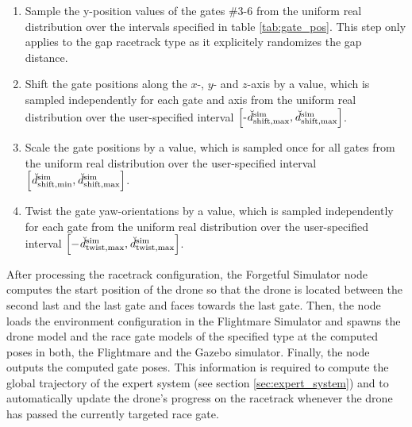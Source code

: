\begin{enumerate}
    \item Sample the y-position values 
    of the gates \#3-6 from the uniform real distribution
    over the intervals specified in table \ref{tab:gate_pos}.
    This step only applies to the gap racetrack type
    as it explicitely randomizes the gap distance.
    \item Shift the gate positions along the $x$-, $y$- and $z$-axis
    by a value, which is sampled
    independently for each gate and axis
    from the uniform real distribution
    over the user-specified interval 
    $\left[
        \text{-}\dist[\user]{\text{sim}}{\text{shift},\mxm}{}{},
        \dist[\user]{\text{sim}}{\text{shift},\mxm}{}{}\right]$.
    \item Scale the gate positions by a value,
    which is sampled once for all gates from the uniform real distribution
    over the user-specified interval
    $\left[
        \dist[\user]{\text{sim}}{\text{shift},\mnm}{}{}, 
        \dist[\user]{\text{sim}}{\text{shift},\mxm}{}{}\right]$.
    \item Twist the gate yaw-orientations
    by a value, which is sampled 
    independently for each gate 
    from the uniform real distribution
    over the user-specified interval
    $\left[
        -\dist[\user]{\text{sim}}{\text{twist},\mxm}{}{},
        \dist[\user]{\text{sim}}{\text{twist},\mxm}{}{}\right]$.
\end{enumerate}
After processing the racetrack configuration,
the Forgetful Simulator node computes
the start position of the drone so that
the drone is located between the second last and the last gate
and faces towards the last gate.
Then, the node loads the 
environment configuration
in the Flightmare Simulator 
and 
spawns the drone model 
and the race gate models of the specified type
at the computed poses
in both, the Flightmare and the Gazebo simulator.
Finally, the node
outputs the computed gate poses.
This information is required 
to compute the global trajectory of the expert system
(see section \ref{sec:expert_system})
and to automatically update the drone's progress on the racetrack
whenever the drone has passed the currently targeted race gate.





